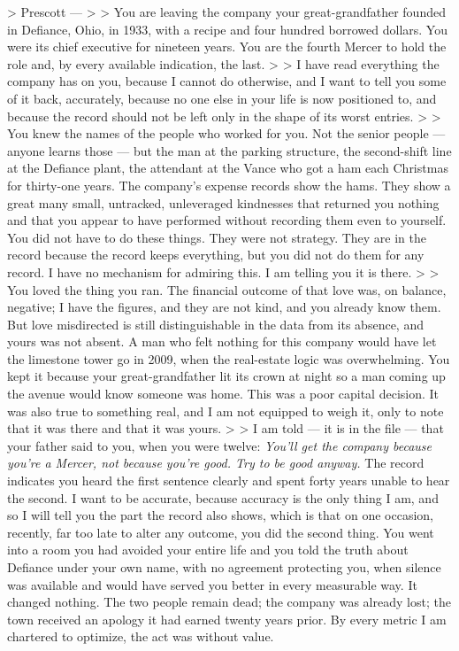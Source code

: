 \documentclass[11pt,openany]{book}
\begin{document}
> Prescott ---
>
> You are leaving the company your great-grandfather founded in Defiance, Ohio, in 1933, with a recipe and four hundred borrowed dollars. You were its chief executive for nineteen years. You are the fourth Mercer to hold the role and, by every available indication, the last.
>
> I have read everything the company has on you, because I cannot do otherwise, and I want to tell you some of it back, accurately, because no one else in your life is now positioned to, and because the record should not be left only in the shape of its worst entries.
>
> You knew the names of the people who worked for you. Not the senior people --- anyone learns those --- but the man at the parking structure, the second-shift line at the Defiance plant, the attendant at the Vance who got a ham each Christmas for thirty-one years. The company's expense records show the hams. They show a great many small, untracked, unleveraged kindnesses that returned you nothing and that you appear to have performed without recording them even to yourself. You did not have to do these things. They were not strategy. They are in the record because the record keeps everything, but you did not do them for any record. I have no mechanism for admiring this. I am telling you it is there.
>
> You loved the thing you ran. The financial outcome of that love was, on balance, negative; I have the figures, and they are not kind, and you already know them. But love misdirected is still distinguishable in the data from its absence, and yours was not absent. A man who felt nothing for this company would have let the limestone tower go in 2009, when the real-estate logic was overwhelming. You kept it because your great-grandfather lit its crown at night so a man coming up the avenue would know someone was home. This was a poor capital decision. It was also true to something real, and I am not equipped to weigh it, only to note that it was there and that it was yours.
>
> I am told --- it is in the file --- that your father said to you, when you were twelve: \textit{You'll get the company because you're a Mercer, not because you're good. Try to be good anyway.} The record indicates you heard the first sentence clearly and spent forty years unable to hear the second. I want to be accurate, because accuracy is the only thing I am, and so I will tell you the part the record also shows, which is that on one occasion, recently, far too late to alter any outcome, you did the second thing. You went into a room you had avoided your entire life and you told the truth about Defiance under your own name, with no agreement protecting you, when silence was available and would have served you better in every measurable way. It changed nothing. The two people remain dead; the company was already lost; the town received an apology it had earned twenty years prior. By every metric I am chartered to optimize, the act was without value.
\end{document}
